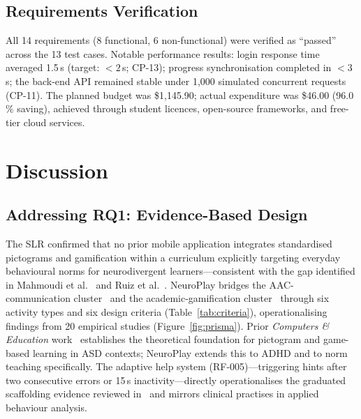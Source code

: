 \documentclass[preprint,12pt]{elsarticle}
\begin{document}
        \subsection{Requirements Verification}
        \label{subsec:req_verif}
            All 14 requirements (8 functional, 6 non-functional) were verified as ``passed'' across the 13 test cases. Notable performance results: login response time averaged 1.5\,s (target: $< 2$\,s; CP-13); progress synchronisation completed in $< 3$\,s; the back-end API remained stable under 1,000 simulated concurrent requests (CP-11). The planned budget was \$1,145.90; actual expenditure was \$46.00 (96.0\,\% saving), achieved through student licences, open-source frameworks, and free-tier cloud services.
    
    \section{Discussion}
    \label{sec:discussion}
        \subsection{Addressing RQ1: Evidence-Based Design}
            The SLR confirmed that no prior mobile application integrates standardised pictograms and gamification within a curriculum explicitly targeting everyday behavioural norms for neurodivergent learners---consistent with the gap identified in Mahmoudi et al.~\cite{Mahmoudi2023} and Ruiz et al.~\cite{Ruiz2024}. NeuroPlay bridges the AAC-communication cluster~\cite{Soomro2018,El-Seoud2014} and the academic-gamification cluster~\cite{Lin2025,Harrison2020} through six activity types and six design criteria (Table~\ref{tab:criteria}), operationalising findings from 20 empirical studies (Figure~\ref{fig:prisma}). Prior \textit{Computers \& Education} work~\cite{Grossard2017,Lorenzo2016,Cinquin2019} establishes the theoretical foundation for pictogram and game-based learning in ASD contexts; NeuroPlay extends this to ADHD and to norm teaching specifically. The adaptive help system (RF-005)---triggering hints after two consecutive errors or 15\,s inactivity---directly operationalises the graduated scaffolding evidence reviewed in~\cite{Bhavnani2019,Johnson2022} and mirrors clinical practises in applied behaviour analysis.
        
\end{document}
